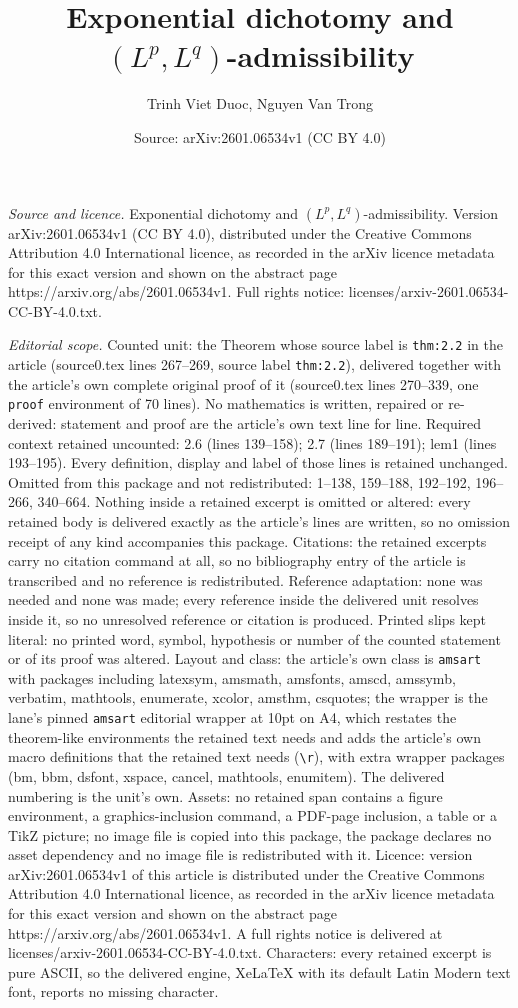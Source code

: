\documentclass[10pt,a4paper]{amsart}
\title[Exponential dichotomy and $(L^p,L^q)$-admissibility]{Exponential dichotomy and $(L^p,L^q)$-admissibility}
\author{Trinh Viet Duoc, Nguyen Van Trong}
\date{Source: arXiv:2601.06534v1 (CC BY 4.0)}
\begin{document}
\maketitle

\noindent\emph{Source and licence.} Exponential dichotomy and $(L^p,L^q)$-admissibility. Version arXiv:2601.06534v1 (CC BY 4.0), distributed under the Creative Commons Attribution 4.0 International licence, as recorded in the arXiv licence metadata for this exact version and shown on the abstract page https://arxiv.org/abs/2601.06534v1. Full rights notice: licenses/arxiv-2601.06534-CC-BY-4.0.txt.\par\smallskip

\noindent\textit{Editorial scope.} Counted unit: the Theorem whose source label is \texttt{thm:2.2} in the article (source0.tex lines 267--269, source label \texttt{thm:2.2}), delivered together with the article's own complete original proof of it (source0.tex lines 270--339, one \texttt{proof} environment of 70 lines). No mathematics is written, repaired or re-derived: statement and proof are the article's own text line for line. Required context retained uncounted: 2.6 (lines 139--158); 2.7 (lines 189--191); lem1 (lines 193--195). Every definition, display and label of those lines is retained unchanged. Omitted from this package and not redistributed: 1--138, 159--188, 192--192, 196--266, 340--664. Nothing inside a retained excerpt is omitted or altered: every retained body is delivered exactly as the article's lines are written, so no omission receipt of any kind accompanies this package. Citations: the retained excerpts carry no citation command at all, so no bibliography entry of the article is transcribed and no reference is redistributed. Reference adaptation: none was needed and none was made; every reference inside the delivered unit resolves inside it, so no unresolved reference or citation is produced. Printed slips kept literal: no printed word, symbol, hypothesis or number of the counted statement or of its proof was altered. Layout and class: the article's own class is \texttt{amsart} with packages including latexsym, amsmath, amsfonts, amscd, amssymb, verbatim, mathtools, enumerate, xcolor, amsthm, csquotes; the wrapper is the lane's pinned \texttt{amsart} editorial wrapper at 10pt on A4, which restates the theorem-like environments the retained text needs and adds the article's own macro definitions that the retained text needs (\texttt{\textbackslash r}), with extra wrapper packages (bm, bbm, dsfont, xspace, cancel, mathtools, enumitem). The delivered numbering is the unit's own. Assets: no retained span contains a figure environment, a graphics-inclusion command, a PDF-page inclusion, a table or a TikZ picture; no image file is copied into this package, the package declares no asset dependency and no image file is redistributed with it. Licence: version arXiv:2601.06534v1 of this article is distributed under the Creative Commons Attribution 4.0 International licence, as recorded in the arXiv licence metadata for this exact version and shown on the abstract page https://arxiv.org/abs/2601.06534v1. A full rights notice is delivered at licenses/arxiv-2601.06534-CC-BY-4.0.txt. Characters: every retained excerpt is pure ASCII, so the delivered engine, XeLaTeX with its default Latin Modern text font, reports no missing character.
\end{document}
